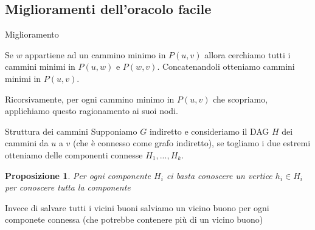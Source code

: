 \documentclass{beamer}
\newcounter{counter1}
\theoremstyle{plain}
\newtheorem{mypro}[counter1]{Proposizione}
\theoremstyle{definition}
\theoremstyle{remark}
\newcommand{\pa}[1]{\left(#1\right)}
\begin{document}
\subsection{Miglioramenti dell'oracolo facile}

\begin{frame}{Miglioramento}
  \begin{block}{}
    Se $w$ appartiene ad un cammino minimo in $P(u,v)$ allora
    cerchiamo tutti i cammini minimi in $P(u,w)$ e
    $P(w,v)$. Concatenandoli otteniamo cammini minimi in $P\pa{u,v}$.
  \end{block}
  \vfill

  Ricorsivamente, per ogni cammino minimo in $P\pa{u,v}$ che
  scopriamo, applichiamo questo ragionamento ai suoi nodi.  
\end{frame}

\begin{frame}{Struttura dei cammini}
  Supponiamo $G$ indiretto e consideriamo il DAG $H$ dei cammini da
  $u$ a $v$ (che \`e connesso come grafo indiretto), se togliamo i due
  estremi otteniamo delle componenti connesse $H_1,...,H_k$.

  \begin{mypro}
    Per ogni componente $H_i$ ci basta conoscere un vertice $h_i \in H_i$
    per conoscere tutta la componente
  \end{mypro}
  \vfill \pause

  Invece di salvare tutti i vicini buoni salviamo un vicino buono per
  ogni componete connessa (che potrebbe contenere più di un vicino
  buono)
\end{frame}
\end{document}

